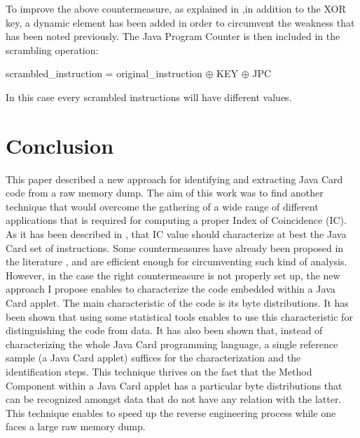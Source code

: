To improve the above countermeasure, as explained in \cite{dynamicsyntax},in addition to the XOR
key, a dynamic element has been added in order to circumvent the weakness that has been noted
previously. The Java Program Counter is then included in the scrambling operation:
 
 \begin{center}
scrambled\_instruction = original\_instruction $\oplus$ KEY $\oplus$ JPC
\end{center}

In this case every scrambled instructions will have different values.

\section{Conclusion}
This paper described a new approach for identifying and extracting Java Card code from a raw memory
dump. The aim of this work was to find another technique that would overcome the gathering of a wide range of
different applications that is required for computing a proper Index of
Coincidence (IC). As it has been described in \cite{conf/cardis/LanetBLCMMF14}, that IC value should characterize at best the Java Card set of instructions.
Some countermeasures have already been proposed in the literature
\cite{barbuthesis}, \cite{dynamicsyntax} and are efficient enough for
circumventing such kind of analysis. However, in the case the right
countermeasure is not properly set up, the new approach I propose enables to
characterize the code embedded within a Java Card applet. The main characteristic of the code is its byte distributions. It has been shown that using some statistical tools enables to use this characteristic
for distinguishing the code from data. It has also been shown that,
instead of characterizing the whole Java Card programming language, a single
reference sample (a Java Card applet) suffices for the characterization and the
identification steps. This technique thrives on the fact that the Method
Component within a Java Card applet has a particular byte distributions that
can be recognized amongst data that do not have any relation with the latter. This technique enables to speed up the reverse engineering process while one faces a large raw memory dump.

